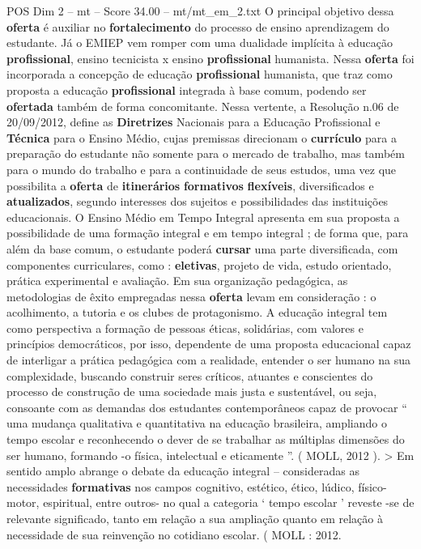 \begin{textsample}{POS Dim 2 – mt – Score 34.00 – mt/mt\_em\_2.txt}
O principal objetivo dessa \textbf{oferta} é auxiliar no \textbf{fortalecimento} do processo de ensino aprendizagem do estudante.
Já o EMIEP vem romper com uma dualidade implícita à educação \textbf{profissional}, ensino tecnicista x ensino \textbf{profissional} humanista.
Nessa \textbf{oferta} foi incorporada a concepção de educação \textbf{profissional} humanista, que traz como proposta a educação \textbf{profissional} integrada à base comum, podendo ser \textbf{ofertada} também de forma concomitante.
Nessa vertente, a Resolução n.06 de 20/09/2012, define as \textbf{Diretrizes} Nacionais para a Educação Profissional e \textbf{Técnica} para o Ensino Médio, cujas premissas direcionam o \textbf{currículo} para a preparação do estudante não somente para o mercado de trabalho, mas também para o mundo do trabalho e para a continuidade de seus estudos, uma vez que possibilita a \textbf{oferta} de \textbf{itinerários} \textbf{formativos} \textbf{flexíveis}, diversificados e \textbf{atualizados}, segundo interesses dos sujeitos e possibilidades das instituições educacionais.
O Ensino Médio em Tempo Integral apresenta em sua proposta a possibilidade de uma formação integral e em tempo integral ; de forma que, para além da base comum, o estudante poderá \textbf{cursar} uma parte diversificada, com componentes curriculares, como : \textbf{eletivas}, projeto de vida, estudo orientado, prática experimental e avaliação.
Em sua organização pedagógica, as metodologias de êxito empregadas nessa \textbf{oferta} levam em consideração : o acolhimento, a tutoria e os clubes de protagonismo.
A educação integral tem como perspectiva a formação de pessoas éticas, solidárias, com valores e princípios democráticos, por isso, dependente de uma proposta educacional capaz de interligar a prática pedagógica com a realidade, entender o ser humano na sua complexidade, buscando construir seres críticos, atuantes e conscientes do processo de construção de uma sociedade mais justa e sustentável, ou seja, consoante com as demandas dos estudantes contemporâneos capaz de provocar “ uma mudança qualitativa e quantitativa na educação brasileira, ampliando o tempo escolar e reconhecendo o dever de se trabalhar as múltiplas dimensões do ser humano, formando -o física, intelectual e eticamente ”. ( MOLL, 2012 ). > Em sentido amplo abrange o debate da educação integral – consideradas as necessidades \textbf{formativas} nos campos cognitivo, estético, ético, lúdico, físico-motor, espiritual, entre outros- no qual a categoria ‘ tempo escolar ’ reveste -se de relevante significado, tanto em relação a sua ampliação quanto em relação à necessidade de sua reinvenção no cotidiano escolar. ( MOLL : 2012.

\end{textsample}
